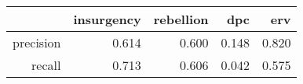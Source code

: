 \begin{tabular}{rrrrr}
  \hline
 & insurgency & rebellion & dpc & erv \\ 
  \hline
precision & 0.614 & 0.600 & 0.148 & 0.820 \\ 
  recall & 0.713 & 0.606 & 0.042 & 0.575 \\ 
   \hline
\end{tabular}
